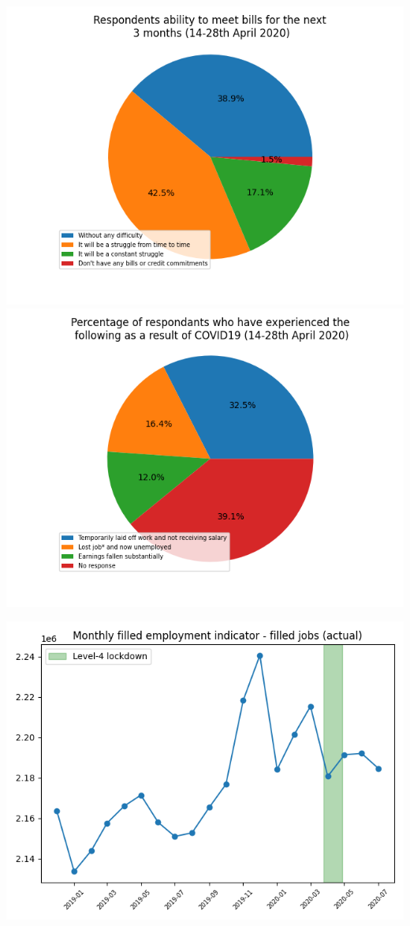 \documentclass{article}
\begin{document}
\begin{center}
\includegraphics[scale=0.5]{plots/household.png}
\includegraphics[scale=0.5]{plots/personal.png}
\end{center}

\begin{center}
\includegraphics[scale=0.5]{plots/jobs.png}
\end{center}
\end{document}
